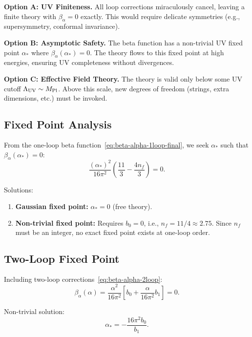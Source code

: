 \documentclass[11pt,a4paper]{article}
\numberwithin{equation}{section}
\theoremstyle{plain}
\theoremstyle{definition}
\theoremstyle{remark}
\begin{document}
\textbf{Option A: UV Finiteness.} All loop corrections miraculously cancel, leaving a finite theory with $\beta_\alpha=0$ exactly. This would require delicate symmetries (e.g., supersymmetry, conformal invariance).

\textbf{Option B: Asymptotic Safety.} The beta function has a non-trivial UV fixed point $\alpha_*$ where $\beta_\alpha(\alpha_*)=0$. The theory flows to this fixed point at high energies, ensuring UV completeness without divergences.

\textbf{Option C: Effective Field Theory.} The theory is valid only below some UV cutoff $\Lambda_{\rm UV} \sim M_{\rm Pl}$. Above this scale, new degrees of freedom (strings, extra dimensions, etc.) must be invoked.

\subsection{Fixed Point Analysis}

From the one-loop beta function~\eqref{eq:beta-alpha-1loop-final}, we seek $\alpha_*$ such that $\beta_\alpha(\alpha_*)=0$:
\begin{equation}
\frac{(\alpha_*)^2}{16\pi^2}\left(\frac{11}{3} - \frac{4n_f}{3}\right) = 0.
\label{eq:fixed-point-eqn}
\end{equation}

Solutions:
\begin{enumerate}
  \item \textbf{Gaussian fixed point:} $\alpha_*=0$ (free theory).
  \item \textbf{Non-trivial fixed point:} Requires $b_0=0$, i.e., $n_f = 11/4 \approx 2.75$. Since $n_f$ must be an integer, no exact fixed point exists at one-loop order.
\end{enumerate}

\subsection{Two-Loop Fixed Point}

Including two-loop corrections~\eqref{eq:beta-alpha-2loop}:
\begin{equation}
\beta_\alpha(\alpha) = \frac{\alpha^2}{16\pi^2}\left[b_0 + \frac{\alpha}{16\pi^2}b_1\right] = 0.
\label{eq:beta-2loop-fixed}
\end{equation}

Non-trivial solution:
\begin{equation}
\alpha_* = -\frac{16\pi^2 b_0}{b_1}.
\label{eq:alpha-star-2loop}
\end{equation}
\end{document}
